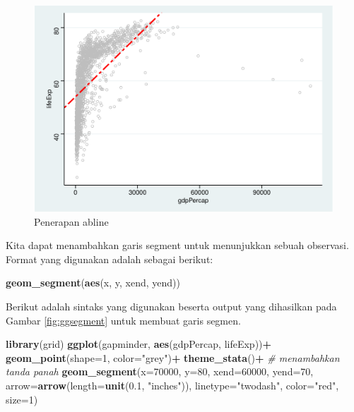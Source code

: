 \documentclass[]{book}
\newenvironment{Shaded}{\begin{snugshade}}{\end{snugshade}}
\newcommand{\KeywordTok}[1]{\textcolor[rgb]{0.13,0.29,0.53}{\textbf{#1}}}
\newcommand{\DataTypeTok}[1]{\textcolor[rgb]{0.13,0.29,0.53}{#1}}
\newcommand{\DecValTok}[1]{\textcolor[rgb]{0.00,0.00,0.81}{#1}}
\newcommand{\FloatTok}[1]{\textcolor[rgb]{0.00,0.00,0.81}{#1}}
\newcommand{\StringTok}[1]{\textcolor[rgb]{0.31,0.60,0.02}{#1}}
\newcommand{\CommentTok}[1]{\textcolor[rgb]{0.56,0.35,0.01}{\textit{#1}}}
\newcommand{\OperatorTok}[1]{\textcolor[rgb]{0.81,0.36,0.00}{\textbf{#1}}}
\newcommand{\NormalTok}[1]{#1}
\begin{document}
\begin{figure}

{\centering \includegraphics[width=0.7\linewidth]{EnvStat_files/figure-latex/ggabline-1} 

}

\caption{Penerapan abline}\label{fig:ggabline}
\end{figure}

Kita dapat menambahkan garis segment untuk menunjukkan sebuah observasi.
Format yang digunakan adalah sebagai berikut:

\begin{Shaded}
\begin{Highlighting}[]
\KeywordTok{geom_segment}\NormalTok{(}\KeywordTok{aes}\NormalTok{(x, y, xend, yend))}
\end{Highlighting}
\end{Shaded}

Berikut adalah sintaks yang digunakan beserta output yang dihasilkan
pada Gambar \ref{fig:ggsegment} untuk membuat garis segmen.

\begin{Shaded}
\begin{Highlighting}[]
\KeywordTok{library}\NormalTok{(grid)}
\KeywordTok{ggplot}\NormalTok{(gapminder, }\KeywordTok{aes}\NormalTok{(gdpPercap, lifeExp))}\OperatorTok{+}
\StringTok{  }\KeywordTok{geom_point}\NormalTok{(}\DataTypeTok{shape=}\DecValTok{1}\NormalTok{, }\DataTypeTok{color=}\StringTok{"grey"}\NormalTok{)}\OperatorTok{+}
\StringTok{  }\KeywordTok{theme_stata}\NormalTok{()}\OperatorTok{+}
\StringTok{  }\CommentTok{# menambahkan tanda panah}
\StringTok{  }\KeywordTok{geom_segment}\NormalTok{(}\DataTypeTok{x=}\DecValTok{70000}\NormalTok{, }\DataTypeTok{y=}\DecValTok{80}\NormalTok{,}
                   \DataTypeTok{xend=}\DecValTok{60000}\NormalTok{, }\DataTypeTok{yend=}\DecValTok{70}\NormalTok{,}
                   \DataTypeTok{arrow=}\KeywordTok{arrow}\NormalTok{(}\DataTypeTok{length=}\KeywordTok{unit}\NormalTok{(}\FloatTok{0.1}\NormalTok{, }\StringTok{"inches"}\NormalTok{)),}
               \DataTypeTok{linetype=}\StringTok{"twodash"}\NormalTok{,}
               \DataTypeTok{color=}\StringTok{"red"}\NormalTok{,}
               \DataTypeTok{size=}\DecValTok{1}\NormalTok{)}
\end{Highlighting}
\end{Shaded}
\end{document}
